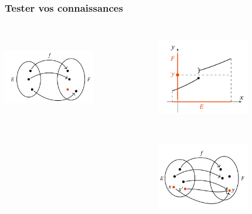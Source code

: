 \begin{frame}[<+->]
  \frametitle{Tester vos connaissances}

  \begin{columns}
    \begin{column}{0.5\textwidth}

      {

        \includegraphics[width=4cm, height=4cm]{./injectivit_q2.png}
      }
    \end{column}
    \begin{column}{0.5\textwidth}
      
      {

        \includegraphics[width=4cm, height=4cm]{./injectivit_q3.png}
      }

      {

        \includegraphics[width=4cm, height=4cm]{./injectivit_q4.png}
      }
    \end{column}
  \end{columns}
  
\end{frame}


